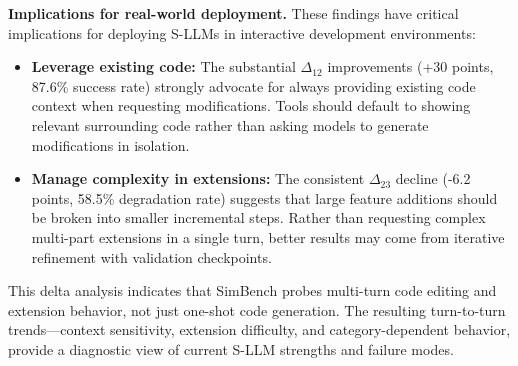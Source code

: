 \documentclass{ieeeaccess}
\begin{document}

\textbf{Implications for real-world deployment.}
These findings have critical implications for deploying S-LLMs in interactive development environments:

\begin{itemize}
    \item \textbf{Leverage existing code:} The substantial $\Delta_{12}$ improvements (+30 points, 87.6\% success rate) strongly advocate for always providing existing code context when requesting modifications. Tools should default to showing relevant surrounding code rather than asking models to generate modifications in isolation.
    
    \item \textbf{Manage complexity in extensions:} The consistent $\Delta_{23}$ decline (-6.2 points, 58.5\% degradation rate) suggests that large feature additions should be broken into smaller incremental steps. Rather than requesting complex multi-part extensions in a single turn, better results may come from iterative refinement with validation checkpoints.
\end{itemize}

This delta analysis indicates that SimBench probes multi-turn code editing and extension behavior, not just one-shot code generation. The resulting turn-to-turn trends—context sensitivity, extension difficulty, and category-dependent behavior, provide a diagnostic view of current S-LLM strengths and failure modes.
\end{document}
